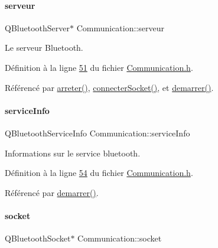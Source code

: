 \paragraph{\texorpdfstring{serveur}{serveur}}
{\footnotesize\ttfamily Q\+Bluetooth\+Server$\ast$ Communication\+::serveur\hspace{0.3cm}{\ttfamily [private]}}



Le serveur Bluetooth. 



Définition à la ligne \hyperlink{_communication_8h_source_l00051}{51} du fichier \hyperlink{_communication_8h_source}{Communication.\+h}.



Référencé par \hyperlink{_communication_8cpp_source_l00099}{arreter()}, \hyperlink{_communication_8cpp_source_l00116}{connecter\+Socket()}, et \hyperlink{_communication_8cpp_source_l00073}{demarrer()}.

\mbox{\label{class_communication_aa7f9ee5e5d90336a56857ebc229e4274}} 
\paragraph{\texorpdfstring{service\+Info}{serviceInfo}}
{\footnotesize\ttfamily Q\+Bluetooth\+Service\+Info Communication\+::service\+Info\hspace{0.3cm}{\ttfamily [private]}}



Informations sur le service bluetooth. 



Définition à la ligne \hyperlink{_communication_8h_source_l00054}{54} du fichier \hyperlink{_communication_8h_source}{Communication.\+h}.



Référencé par \hyperlink{_communication_8cpp_source_l00073}{demarrer()}.

\mbox{\label{class_communication_aa4ddc3151b305db0135d5826384645cc}} 
\paragraph{\texorpdfstring{socket}{socket}}
{\footnotesize\ttfamily Q\+Bluetooth\+Socket$\ast$ Communication\+::socket\hspace{0.3cm}{\ttfamily [private]}}



